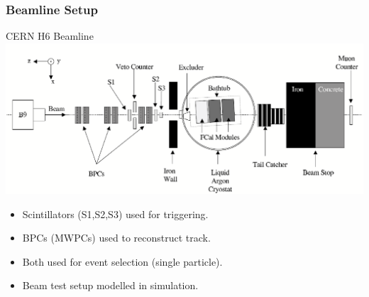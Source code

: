 \documentclass[10pt]{beamer}
\begin{document}
\begin{frame}
\begin{columns}
\end{columns}
\end{frame}

\begin{frame}\frametitle{Beamline Setup}
CERN H6 Beamline
\includegraphics[width=0.8\linewidth,angle=0]{TB_Beamline.eps}
\begin{itemize}
\item Scintillators (S1,S2,S3) used for triggering.
\item BPCs (MWPCs) used to reconstruct track.
\item Both used for event selection (single particle).
\item Beam test setup modelled in \geant simulation.
\end{itemize}
\end{frame}
\end{document}
